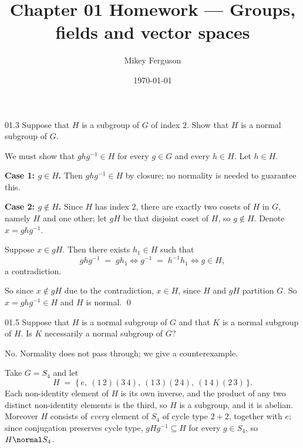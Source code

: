 \documentclass[11pt]{article}
\title{Chapter 01 Homework --- Groups, fields and vector spaces}
\author{Mikey Ferguson}
\date{\today}
\begin{document}
\maketitle


\begin{problem}{01.3}
  Suppose that $H$ is a subgroup of $G$ of index $2$. Show that $H$ is a normal
  subgroup of $G$.
\end{problem}
We must show that $g h g^{-1} \in H$ for every $g \in G$ and every $h \in H$.
Let $h \in H$.

\medskip
\noindent\textbf{Case 1: $g \in H$.}
Then $g h g^{-1} \in H$ by closure; no normality is needed to guarantee this.

\medskip
\noindent\textbf{Case 2: $g \notin H$.}
Since $H$ has index $2$, there are exactly two cosets of $H$ in $G$, namely $H$ and
one other; let $gH$ be that disjoint coset of $H$, so $g \notin H$. Denote
$x = g h g^{-1}$.

Suppose $x \in gH$. Then there exists $h_1 \in H$ such that
\[
  g h g^{-1} \;=\; g h_1
  \iff g^{-1} \;=\; h^{-1} h_1
  \iff g \in H,
\]
a contradiction.

So since $x \notin gH$ due to the contradiction, $x \in H$, since $H$ and $gH$
partition $G$. So $x = g h g^{-1} \in H$ and $H$ is normal. \qed

\begin{problem}{01.5}
  Suppose that $H$ is a normal subgroup of $G$ and that $K$ is a normal subgroup
  of $H$. Is $K$ necessarily a normal subgroup of $G$?
\end{problem}
No. Normality does not pass through; we give a counterexample.

\medskip
\noindent Take $G = S_4$ and let
\[
  H \;=\; \{\, e,\ (1\,2)(3\,4),\ (1\,3)(2\,4),\ (1\,4)(2\,3) \,\}.
\]
Each non-identity element of $H$ is its own inverse, and the product of any two
distinct non-identity elements is the third, so $H$ is a subgroup, and it is
abelian. Moreover $H$ consists of \emph{every} element of $S_4$ of cycle type
$2+2$, together with $e$; since conjugation preserves cycle type,
$g H g^{-1} \subseteq H$ for every $g \in S_4$, so $H \normal S_4$.
\end{document}
